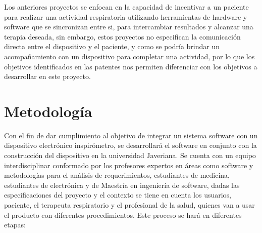 Los anteriores proyectos se enfocan en la capacidad de incentivar a un paciente para realizar una actividad respiratoria utilizando herramientas de hardware y software que se sincronizan entre si, para intercambiar resultados y alcanzar una terapia deseada, sin embargo, estos proyectos no especifican la comunicaci\'on directa entre el dispositivo y el paciente, y como se podr\'ia brindar un acompa\~{n}amiento con un dispositivo para completar una actividad, por lo que los objetivos identificados en las patentes nos permiten diferenciar con los objetivos a desarrollar en este proyecto.








\section{Metodolog\'ia}



Con el fin de dar cumplimiento al objetivo de integrar un sistema software con un dispositivo electr\'onico inspir\'ometro, se desarrollar\'a el software en conjunto con la construcci\'on del dispositivo en la universidad Javeriana. Se cuenta con un equipo interdisciplinar conformado por los profesores expertos en \'areas como software y metodolog\'ias para el an\'alisis de requerimientos, estudiantes de medicina, estudiantes de electr\'onica y de Maestr\'ia en ingenier\'ia de software, dadas las especificaciones del proyecto y el contexto se tiene en cuenta los usuarios, paciente, el terapeuta respiratorio y el profesional de la salud, quienes van a usar el producto con diferentes procedimientos. Este proceso se har\'a en diferentes etapas: \\



\renewcommand{\labelenumii}{\theenumii}
\renewcommand{\theenumii}{\theenumi.\arabic{enumii}.}

